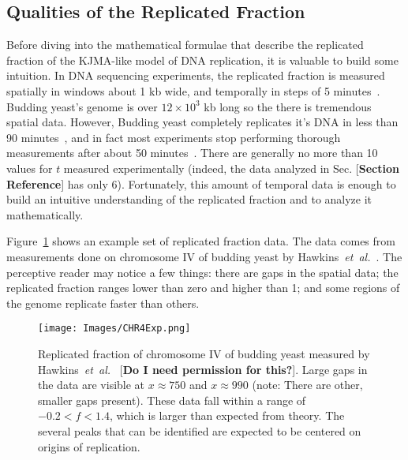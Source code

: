 	
		\subsection{Qualities of the Replicated Fraction}
		\label{subsec:QualitiesReplicatedFraction}
		
		Before diving into the mathematical formulae that describe the replicated fraction of the KJMA-like model of DNA replication, it is valuable to build some intuition.
		In DNA sequencing experiments, the replicated fraction is measured spatially in windows about 1 kb wide, and temporally in steps of 5 minutes~\cite{StochasticTermination}.
		Budding yeast's genome is over $12\times10^3$ kb long so the there is tremendous spatial data.
		However, Budding yeast completely replicates it's DNA in less than 90 minutes~\cite{DeepSeq}, and in fact most experiments stop performing thorough measurements after about 50 minutes~\cite{StochasticTermination,DeepSeq,McCuneMicroArray}.
		There are generally no more than 10 values for $t$ measured experimentally (indeed, the data analyzed in Sec. [\textbf{Section Reference}] has only 6).
		Fortunately, this amount of temporal data is enough to build an intuitive understanding of the replicated fraction and to analyze it mathematically.
		
		Figure~\ref{fig:ReplicatedFractionExample} shows an example set of replicated fraction data.
		The data comes from measurements done on chromosome IV of budding yeast by Hawkins~\emph{et~al.}~\cite{StochasticTermination}.
		The perceptive reader may notice a few things:
		there are gaps in the spatial data;
		the replicated fraction ranges lower than zero and higher than 1;
		and some regions of the genome replicate faster than others.
		
		\begin{figure}[tbh]
			\begin{center}
				\texttt{[image: Images/CHR4Exp.png]}
			\end{center}
				\caption[Budding yeast chromosome IV replicated fraction]{\label{fig:ReplicatedFractionExample} Replicated fraction of chromosome IV of budding yeast measured by Hawkins~\emph{et~al.}~\cite{StochasticTermination} [\textbf{Do I need permission for this?}].	
					Large gaps in the data are visible at $x \approx 750$ and $x \approx 990$ (note: There are other, smaller gaps present).
					These data fall within a range of $-0.2 < f < 1.4$, which is larger than expected from theory.
					The several peaks that can be identified are expected to be centered on origins of replication.
				}
		\end{figure}
		
